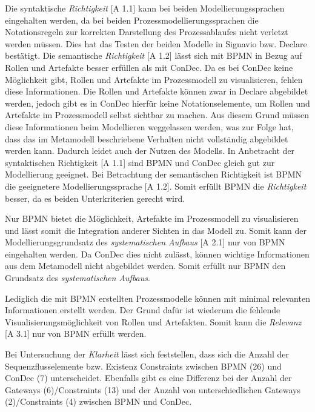 Die syntaktische \textit{Richtigkeit} [A 1.1] kann bei beiden Modellierungssprachen eingehalten werden, da bei beiden Prozessmodellierungssprachen die Notationsregeln zur korrekten Darstellung des Prozessablaufes nicht verletzt werden müssen. Dies hat das Testen der beiden Modelle in Signavio bzw. Declare bestätigt.\newline
Die semantische \textit{Richtigkeit} [A 1.2] lässt sich mit BPMN in Bezug auf Rollen und Artefakte besser erfüllen als mit ConDec. Da es bei ConDec keine Möglichkeit gibt, Rollen und Artefakte im Prozessmodell zu visualisieren, fehlen diese Informationen. Die Rollen und Artefakte können zwar in Declare abgebildet werden, jedoch gibt es in ConDec hierfür keine Notationselemente, um Rollen und Artefakte im Prozessmodell selbst sichtbar zu machen. Aus diesem Grund müssen diese Informationen beim Modellieren weggelassen werden, was zur Folge hat, dass das im Metamodell beschriebene Verhalten nicht vollständig abgebildet werden kann. Dadurch leidet auch der Nutzen des Modells.\newline
In Anbetracht der syntaktischen Richtigkeit [A 1.1] sind BPMN und ConDec gleich gut zur Modellierung geeignet. Bei Betrachtung der semantischen Richtigkeit ist  BPMN die geeignetere Modellierungssprache [A 1.2]. Somit erfüllt BPMN die \textit{Richtigkeit} besser, da es beiden Unterkriterien gerecht wird.\newline

Nur BPMN bietet die Möglichkeit, Artefakte im Prozessmodell zu visualisieren und lässt somit die Integration anderer Sichten in das Modell zu. Somit kann der Modellierungsgrundsatz des \textit{systematischen Aufbaus} [A 2.1] nur von BPMN eingehalten werden. Da ConDec dies nicht zulässt, können wichtige Informationen aus dem Metamodell nicht abgebildet werden. Somit erfüllt nur BPMN den Grundsatz des \textit{systematischen Aufbaus}.\newline 

Lediglich die mit BPMN erstellten Prozessmodelle können mit minimal relevanten Informationen erstellt werden. Der Grund dafür ist wiederum die fehlende Visualisierungsmöglichkeit von Rollen und Artefakten. Somit kann die \textit{Relevanz} [A 3.1] nur von BPMN erfüllt werden.\newline

Bei Untersuchung der \textit{Klarheit} lässt sich feststellen, dass sich die Anzahl der Sequenzflusselemente bzw. Existenz Constraints zwischen BPMN (26) und ConDec (7) unterscheidet. Ebenfalls gibt es eine Differenz bei der Anzahl der Gateways (6)/Constraints (13) und der Anzahl von unterschiedlichen Gateways (2)/Constraints (4) zwischen BPMN und ConDec.\newline

